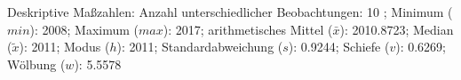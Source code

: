 				\label{tableValues:afec021f}
				\vspace*{-\baselineskip}
                    \begin{noten}
                	    \note{} Deskriptive Maßzahlen:
                	    Anzahl unterschiedlicher Beobachtungen: 10%
                	    ; 
                	      Minimum ($min$): 2008; 
                	      Maximum ($max$): 2017; 
                	      arithmetisches Mittel ($\bar{x}$): \num[round-mode=places,round-precision=2]{2010.8723}; 
                	      Median ($\tilde{x}$): 2011; 
                	      Modus ($h$): 2011; 
                	      Standardabweichung ($s$): \num[round-mode=places,round-precision=2]{0.9244}; 
                	      Schiefe ($v$): \num[round-mode=places,round-precision=2]{0.6269}; 
                	      Wölbung ($w$): \num[round-mode=places,round-precision=2]{5.5578}
                     \end{noten}

